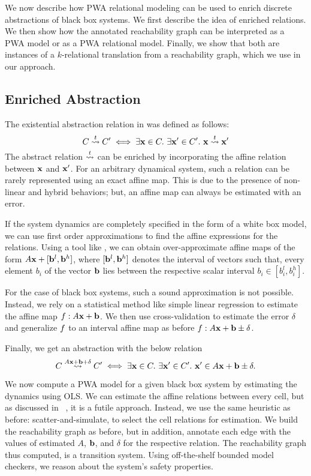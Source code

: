 We now describe how PWA relational modeling can be used to enrich
discrete abstractions of black box systems. We first describe the idea
of enriched relations. We then show how the annotated reachability
graph can be interpreted as a PWA model or as a PWA relational model.
Finally, we show that both are instances of a $k$-relational
translation from a reachability graph, which we use in our approach.

\subsection{Enriched Abstraction}

The existential abstraction relation in  was defined as
follows:
\[
    C \overset{t}{\rightsquigarrow} C' \iff \exists \mathbf{x} \in C.\ \exists \mathbf{x}' \in C'.\ \mathbf{x} \overset{t}{\rightsquigarrow} \mathbf{x}'
\]
The abstract relation $\overset{t}{\rightsquigarrow}$ can be enriched by incorporating
the affine relation between $\mathbf{x}$ and $\mathbf{x}'$. For an arbitrary dynamical
system, such a relation can be rarely represented using an exact affine map.
This is due to the presence of non-linear and hybrid behaviors; but,
an affine map can always be estimated with an error.

If the system dynamics are completely specified in the form of a white
box model, we can use first order approximations to find the affine
expressions for the relations. Using a tool like \flowstar, we can
obtain over-approximate affine maps of the form $A\mathbf{x} + [\mathbf{b}^l,
\mathbf{b}^h]$, where $[\mathbf{b}^l,\mathbf{b}^h]$ denotes the interval of vectors such
that, every element $b_i$ of the vector $\mathbf{b}$ lies between the
respective scalar interval $b_i\in[b^l_i,b^h_i]$.

For the case of black box systems, such a sound approximation is not
possible. Instead, we rely on a statistical method like simple linear
regression to estimate the affine map $f: A\mathbf{x} + \mathbf{b}$. We then use
cross-validation to estimate the error $\delta$ and generalize
$f$ to an interval affine map as before $f: A\mathbf{x} + \mathbf{b} \pm
\delta$.

Finally, we get an abstraction with the below relation
\[
    C \overset{A\mathbf{x}+\mathbf{b}+\delta}{\rightsquigarrow} C' \iff \exists \mathbf{x} \in C.\ \exists \mathbf{x}' \in C'.\
    \mathbf{x}' \in A\mathbf{x} + \mathbf{b} \pm \delta.
\]

We now compute a PWA model for a given black box system by estimating
the dynamics using OLS. We can estimate the affine relations between
every cell, but as discussed in ~\chapref{abs}, it is a futile
approach.  Instead, we use the same heuristic as before:
scatter-and-simulate, to select the cell relations for estimation. We
build the reachability graph as before, but in addition, annotate each
edge with the values of estimated $A$, $\mathbf{b}$, and $\delta$ for the
respective relation. The reachability graph thus computed, is a
transition system. Using off-the-shelf bounded model checkers, we
reason about the system's safety properties.



